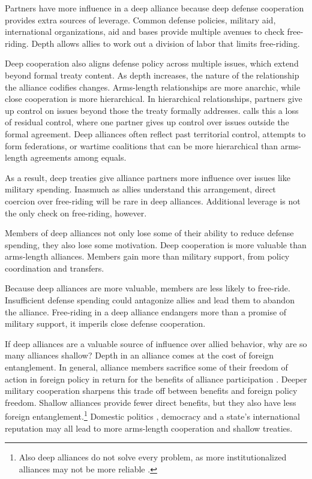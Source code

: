 \documentclass[12pt]{article}
\begin{document}
Partners have more influence in a deep alliance because deep defense cooperation provides extra sources of leverage. 
Common defense policies, military aid, international organizations, aid and bases provide multiple avenues to check free-riding. 
Depth allows allies to work out a division of labor that limits free-riding. 


Deep cooperation also aligns defense policy across multiple issues, which extend beyond formal treaty content. 
As depth increases, the nature of the relationship the alliance codifies changes. 
Arms-length relationships are more anarchic, while close cooperation is more hierarchical. 
In hierarchical relationships, partners give up control on issues beyond those the treaty formally addresses. 
\citet{Lake1996} calls this a loss of residual control, where one partner gives up control over issues outside the formal agreement. 
Deep alliances often reflect past territorial control, attempts to form federations, or wartime coalitions that can be more hierarchical than arms-length agreements among equals. 


As a result, deep treaties give alliance partners more influence over issues like military spending.
Inasmuch as allies understand this arrangement, direct coercion over free-riding will be rare in deep alliances.  
Additional leverage is not the only check on free-riding, however. 


Members of deep alliances not only lose some of their ability to reduce defense spending, they also lose some motivation. 
Deep cooperation is more valuable than arms-length alliances. 
Members gain more than military support, from policy coordination and transfers. 


Because deep alliances are more valuable, members are less likely to free-ride. 
Insufficient defense spending could antagonize allies and lead them to abandon the alliance. 
Free-riding in a deep alliance endangers more than a promise of military support, it imperils close defense cooperation. 


If deep alliances are a valuable source of influence over allied behavior, why are so many alliances shallow? 
Depth in an alliance comes at the cost of foreign entanglement. 
In general, alliance members sacrifice some of their freedom of action in foreign policy in return for the benefits of alliance participation \citep{Altfield1984, Snyder1997}.
Deeper military cooperation sharpens this trade off between benefits and foreign policy freedom. 
Shallow alliances provide fewer direct benefits, but they also have less foreign entanglement.\footnote{Also deep alliances do not solve every problem, as more institutionalized alliances may not be more reliable \citep{LeedsAnac2005}.}
Domestic politics \citep{Davis2004}, democracy \citep{Chibaetal2015} and a state's international reputation \citep{Mattes2012} may all lead to more arms-length cooperation and shallow treaties. 
\end{document}
